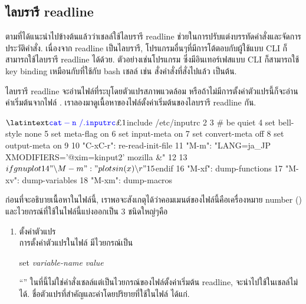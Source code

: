 \begin{thwbr}
\subsection{ไลบรารี readline}
ตามที่ได้แนะนำไปข้างต้นแล้วว่าเชลล์ใช้ไลบรารี readline ช่วยในการปรับแต่งบรรทัดคำสั่งและจัดการประวัติคำสั่ง. เนื่องจาก readline เป็นไลบรารี, โปรแกรมอื่นๆที่มีการโต้ตอบกับผู้ใช้แบบ CLI ก็สามารถใช้ไลบรารี readline ได้ด้วย. ตัวอย่างเช่นโปรแกรม  ซึ่งมีอินเทอร์เฟสแบบ CLI ก็สามารถใช้ key binding เหมือนกับที่ใช้กับ bash เชลล์ เช่น  สั่งคำสั่งที่สั่งไปแล้ว เป็นต้น.

ไลบรารี readline จะอ่านไฟล์ที่ระบุโดยตัวแปรสภาพแวดล้อม  หรือถ้าไม่มีการตั้งค่าตัวแปรนี้ก็จะอ่านค่าเริ่มต้นจากไฟล์ . เราลองมาดูเนื้อหาของไฟล์ตั้งค่าเริ่มต้นของไลบรารี readline กัน. 
\begin{MyExample}\label{ex:inputrc}
\begin{MyEx}
$ \cin{cat -n ~/.inputrc}
     1  $include /etc/inputrc
     2
     3  # be quiet
     4  set bell-style none
     5  set meta-flag on
     6  set input-meta on
     7  set convert-meta off
     8  set output-meta on
     9
    10  "\bs{}C-x\bs{}C-r": re-read-init-file			       
    11  "\bs{}M-m": "LANG=ja_JP XMODIFIERS='@xim=kinput2' mozilla &"   
    12  								       
    13	$if gnuplot						       
    14  "\bs{}M-m": "plot sin(x)\bs{}r"				       
    15  $endif                                                         
    16  "\bs{}M-xf": dump-functions
    17  "\bs{}M-xv": dump-variables
    18  "\bs{}M-xm": dump-macros
\end{MyEx}
\end{MyExample}

ก่อนที่จะอธิบายเนื้อหาในไฟล์นี้, เราพอจะสังเกตุได้ว่าคอมเมนต์ของไฟล์นี้คือเครื่องหมาย number (\cmd{\#}) และไวยกรณ์ที่ใช้ในไฟล์นี้แบ่งออกเป็น 3 ชนิดใหญ่ๆคือ
\begin{enumerate}
\item ตั้งค่าตัวแปร\\
การตั้งค่าตัวแปรในไฟล์  มีไวยกรณ์เป็น
\begin{MyVerbatim}
set \textit{variable-name} \textit{value}
\end{MyVerbatim}
``'' ในที่นี้ไม่ใช่คำสั่งเชลล์แต่เป็นไวยกรณ์ของไฟล์ตั้งค่าเริ่มต้น readline, จะนำไปใช้ในเชลล์ไม่ได้. ชื่อตัวแปรที่สำคัญและค่าโดยปริยายที่ใช้ในไฟล์  ได้แก่.


\end{enumerate}
\end{thwbr}
